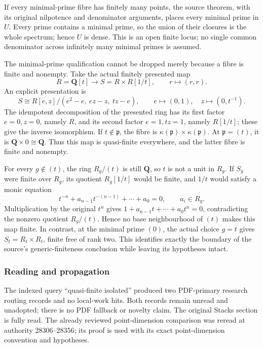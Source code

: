 If every minimal-prime fibre has finitely many points, the source theorem, with its original nilpotence and denominator arguments, places every minimal prime in \(U\). Every prime contains a minimal prime, so the union of their closures is the whole spectrum; hence \(U\) is dense. This is an open finite locus; no single common denominator across infinitely many minimal primes is assumed.

The minimal-prime qualification cannot be dropped merely because a fibre is finite and nonempty. Take the actual finitely presented map \[
 R=\mathbf Q[t]\longrightarrow
 S=R\times R[1/t],\qquad r\longmapsto(r,r).
\] An explicit presentation is \[
 S\cong R[e,z]/(e^2-e,\ ez-z,\ tz-e),
 \qquad e\longmapsto(0,1),\quad z\longmapsto(0,t^{-1}).
\] The idempotent decomposition of the presented ring has its first factor \(e=0,z=0\), namely \(R\), and its second factor \(e=1,tz=1\), namely \(R[1/t]\); these give the inverse isomorphism. If \(t\notin\mathfrak p\), the fibre is \(\kappa(\mathfrak p)\times\kappa(\mathfrak p)\). At \(\mathfrak p=(t)\), it is \(\mathbf Q\times0\cong\mathbf Q\). Thus this map is quasi-finite everywhere, and the latter fibre is finite and nonempty.

For every \(g\notin(t)\), the ring \(R_g/(t)\) is still \(\mathbf Q\), so \(t\) is not a unit in \(R_g\). If \(S_g\) were finite over \(R_g\), its quotient \(R_g[1/t]\) would be finite, and \(1/t\) would satisfy a monic equation \[
 t^{-n}+a_{n-1}t^{-(n-1)}+\cdots+a_0=0,\qquad a_i\in R_g.
\] Multiplication by the original \(t^n\) gives \(1+a_{n-1}t+\cdots+a_0t^n=0\), contradicting the nonzero quotient \(R_g/(t)\). Hence no base neighbourhood of \((t)\) makes this map finite. In contrast, at the minimal prime \((0)\), the actual choice \(g=t\) gives \(S_t=R_t\times R_t\), finite free of rank two. This identifies exactly the boundary of the source's generic-finiteness conclusion while leaving its hypotheses intact.

\subsubsection{Reading and propagation}\label{algebra-proof-031-reading-and-propagation}

The indexed query ``quasi-finite isolated'' produced two PDF-primary research routing records and no local-work hits. Both records remain unread and unadopted; there is no PDF fallback or novelty claim. The original Stacks section is fully read. The already reviewed point-dimension comparison was reread at authority 28306--28356; its proof is used with its exact point-dimension convention and hypotheses.

